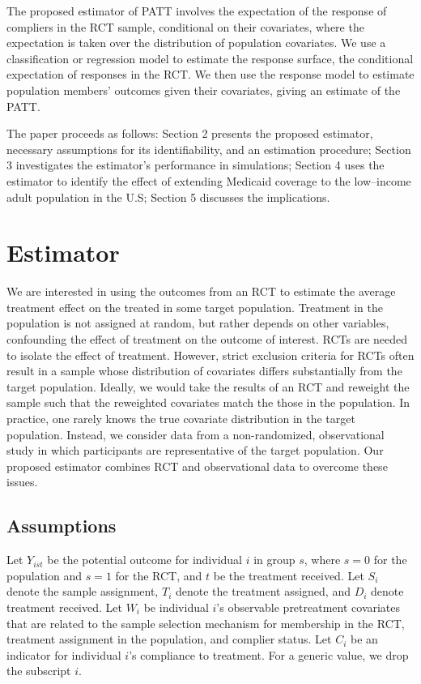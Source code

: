 \documentclass[12pt]{article}
\begin{document}
The proposed estimator of PATT involves the expectation of the response of compliers in the RCT sample, conditional on their covariates, where the expectation is taken over the distribution of population covariates.  We use a classification or regression model to estimate the response surface, the conditional expectation of responses in the RCT.  We then use the response model to estimate population members' outcomes given their covariates, giving an estimate of the PATT. 

The paper proceeds as follows: Section 2 presents the proposed estimator, necessary assumptions for its identifiability, and an estimation procedure; Section 3 investigates the estimator's performance in simulations; Section 4 uses the estimator to identify the effect of extending Medicaid coverage to the low--income adult population in the U.S; Section 5 discusses the implications.

\section{Estimator} \label{estimator}
We are interested in using the outcomes from an RCT to estimate the average treatment effect on the treated in some target population.  Treatment in the population is not assigned at random, but rather depends on other variables, confounding the effect of treatment on the outcome of interest. RCTs are needed to isolate the effect of treatment. However, strict exclusion criteria for RCTs often result in a sample whose distribution of covariates differs substantially from the target population.  Ideally, we would take the results of an RCT and reweight the sample such that the reweighted covariates match the those in the population. In practice, one rarely knows the true covariate distribution in the target population.  Instead, we consider data from a non-randomized, observational study in which participants are representative of the target population.  Our proposed estimator combines RCT and observational data to overcome these issues.

\subsection{Assumptions} 
Let $Y_{ist}$ be the potential outcome for individual $i$ in group $s$, where $s=0$ for the population and $s=1$ for the RCT, and $t$ be the treatment received.  Let $S_i$ denote the sample assignment, $T_i$ denote the treatment assigned, and $D_i$ denote treatment received. Let $W_i$ be individual $i$'s observable pretreatment covariates that are related to the sample selection mechanism for membership in the RCT, treatment assignment in the population, and complier status.  Let $C_i$ be an indicator for individual $i$'s compliance to treatment.  For a generic value, we drop the subscript $i$.  
\end{document}

